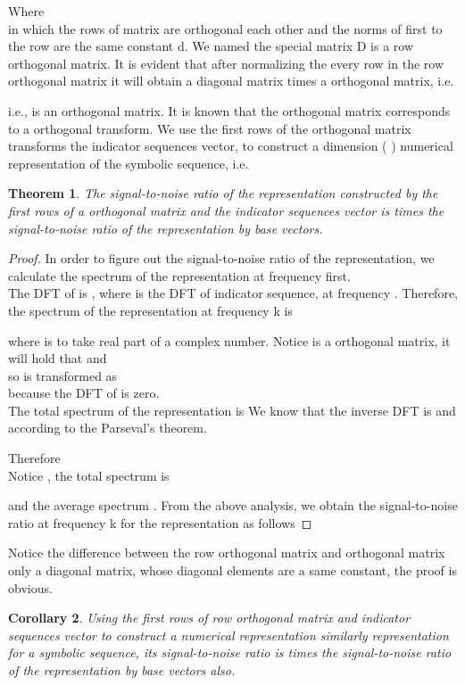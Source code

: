 \documentclass[preprint,authoryear,12pt]{elsarticle}
\newtheorem{thm}{Theorem}[section]
\newtheorem{cor}[thm]{Corollary}
\begin{document}
Where\\


in which the rows of matrix  are orthogonal each other and the norms of  first to the  row are the same constant d. We named the special matrix D is a row orthogonal matrix. It is evident that after normalizing the every row in the row orthogonal matrix it will obtain a diagonal matrix times a orthogonal matrix, i.e.


i.e.,  is an orthogonal matrix. It is known that the orthogonal matrix  corresponds to a orthogonal transform. We use the first  rows of the orthogonal matrix     transforms the indicator sequences vector, to construct a  dimension (  ) numerical representation of the symbolic sequence, i.e.


\begin{thm}
The signal-to-noise ratio of the representation constructed by the first  rows of a orthogonal matrix and the indicator sequences vector is  times the signal-to-noise ratio of the representation by  base vectors.\\
\end{thm}
\begin{proof}
In order to figure out the signal-to-noise ratio of the  representation, we calculate the spectrum of the representation at frequency  first.\\
The DFT of  is , where is  the DFT of indicator sequence, at frequency . Therefore, the spectrum of the representation at frequency k  is

where  is to take real part of a complex number. Notice  is a orthogonal matrix, it will hold that  and  \\
 so  is transformed as\\
 
because the DFT of  is zero.\\

The total spectrum of the   representation is   We know that the inverse DFT is 
 and according to the Parseval's theorem.
 
 Therefore\\
 
 Notice , the total spectrum is
 
 and the average spectrum . From the above analysis, we obtain the signal-to-noise ratio at frequency k for the   representation as follows
 
\end{proof}

Notice the difference between the row orthogonal matrix and orthogonal matrix only a diagonal matrix, whose diagonal elements are a same constant, the proof is obvious.
\begin{cor}
Using the first  rows of row orthogonal matrix and indicator sequences vector to construct a numerical representation similarly  representation for a symbolic sequence, its signal-to-noise ratio is  times the signal-to-noise ratio of the representation by  base vectors also.
\end{cor}
\end{document}
